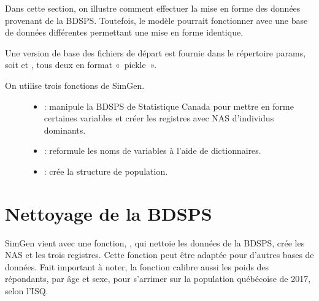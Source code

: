 \documentclass[letterpaper,10pt,french]{sphinxmanual}
\begin{document}
Dans cette section, on illustre comment effectuer la mise en forme des données provenant de la BDSPS. Toutefois, le modèle pourrait fonctionner avec une base de données différentes permettant une mise en forme identique.

Une version de base des fichiers de départ est fournie dans le répertoire params, soit  et , tous deux en format « pickle ».
\begin{description}
\item[{On utilise trois fonctions de SimGen.}] \leavevmode\begin{itemize}
\item {} 
: manipule la BDSPS de Statistique Canada pour mettre en forme certaines variables et créer les registres avec NAS d’individus dominants.

\item {} 
: reformule les noms de variables à l’aide de dictionnaires.

\item {} 
: crée la structure de population.

\end{itemize}

\end{description}

\begin{sphinxVerbatim}[commandchars=\\\{\}]
     
\end{sphinxVerbatim}


\section{Nettoyage de la BDSPS}
\label{\detokenize{import:nettoyage-de-la-bdsps}}
SimGen vient avec une fonction, , qui nettoie les données de la BDSPS, crée les NAS et les trois registres. Cette fonction peut être adaptée pour d’autres bases de données. Fait important à noter, la fonction  calibre aussi les poids des répondants, par âge et sexe, pour s’arrimer sur la population québécoise de 2017, selon l’ISQ.

\begin{sphinxVerbatim}[commandchars=\\\{\}]
  
\end{sphinxVerbatim}
\end{document}
